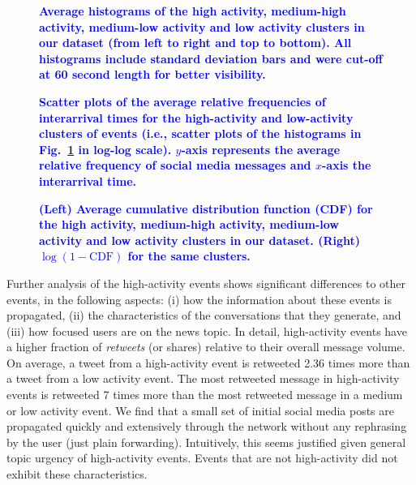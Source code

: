 \documentclass[10pt,letterpaper]{article}
\begin{document}


\begin{figure}
  \centering
  \caption{\textbf{\textcolor{blue}{Average histograms of the high activity,
      medium-high activity, medium-low activity and low activity
      clusters in our dataset (from left to right and top to
      bottom). All histograms include standard deviation bars and were
      cut-off at 60 second length for better visibility.}
    }}\label{fig:fig4}
\end{figure}

\begin{figure}
  \centering
  \caption{\textbf{\textcolor{blue}{Scatter plots of the average relative frequencies of interarrival times
for the high-activity and low-activity clusters of events (i.e., scatter
plots of the histograms in Fig.~\ref{fig:fig4} in log-log scale). $y$-axis
represents the average relative frequency of social media messages and
$x$-axis the interarrival time.}
    }}\label{fig:fig5}
\end{figure}

\begin{figure}
  \centering
  \caption{\textbf{\textcolor{blue}{(Left) Average cumulative distribution function (CDF) for
the high activity, medium-high activity, medium-low activity and low activity clusters in our dataset.
(Right) $\log{(1 - \mathrm{CDF})}$ for the same clusters. }
    }}\label{fig:fig6} %
\end{figure}

Further analysis of the high-activity events shows significant
differences to other events, in the following aspects: (i) how the
information about these events is propagated, (ii) the characteristics
of the conversations that they generate, and (iii) how focused users
are on the news topic. In detail, high-activity events have a higher
fraction of {\em retweets} (or shares) relative to their overall
message volume. On average, a tweet from a high-activity event is
retweeted 2.36 times more than a tweet from a low activity event. The
most retweeted message in high-activity events is retweeted 7 times more
than the most retweeted message in a medium or low activity event. We
find that a small set of initial social media posts are propagated
quickly and extensively through the network without any rephrasing by
the user (just plain forwarding). Intuitively, this seems justified given
general topic urgency of high-activity events. Events that are not
high-activity did not exhibit these characteristics.
\end{document}
